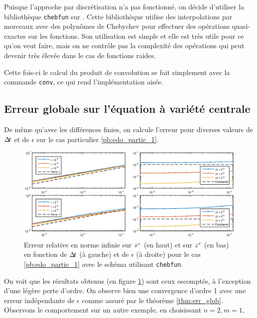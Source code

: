 Puisque l'approche par discrétisation n'a pas fonctionné, on décide d'utiliser la bibliothèque \texttt{chebfun}\cite{chebfun} sur . 
Cette bibliothèque utilise des interpolations par morceaux avec des polynômes de Chebychev pour effectuer des opérations quasi-exactes sur les fonctions. 
Son utilisation est simple et elle est très utile pour ce qu'on veut faire, mais on ne contrôle pas la complexité des opérations qui peut devenir très élevée dans le cas de fonctions raides. 

Cette fois-ci le calcul du produit de convolution se fait simplement avec la commande \texttt{conv}, ce qui rend l'implémentation aisée. 


\subsection{Erreur globale sur l'équation à variété centrale}

De même qu'avec les différences finies, on calcule l'erreur pour diverses valeurs de $\Delta\!\!\!\ t$ et de $\epsilon$ sur le cas particulier \eqref{pb:edo_partic_1}. 
\begin{figure}[!h]
\includegraphics[width=\textwidth]{img/chap3/cheb/conv_rel_cheb_cas1.eps}
\caption{Erreur relative en norme infinie sur $x^{\varepsilon}$ (en haut) et sur $z^{\varepsilon}$ (en bas) en fonction de $\Delta\!\!\!\ t$ (à gauche) et de $\epsilon$ (à droite) pour le cas \eqref{pb:edo_partic_1} avec le schéma utilisant \texttt{chebfun}.}
\label{fig:conv_cheb_cas1}
\end{figure}

On voit que les résultats obtenus (en figure \ref{fig:conv_cheb_cas1}) sont ceux escomptés, à l'exception d'une légère perte d'ordre. 
On observe bien une convergence d'ordre 1 avec une erreur indépendante de $\epsilon$ comme assuré par le théorème \ref{thm:err_glob}. 
Observons le comportement sur un autre exemple, en choisissant $n=2,m=1$,

